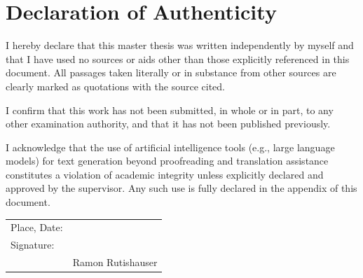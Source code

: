 \chapter*{Declaration of Authenticity}

I hereby declare that this master thesis was written independently by myself and that I have used no sources or aids other than those explicitly referenced in this document. All passages taken literally or in substance from other sources are clearly marked as quotations with the source cited.

I confirm that this work has not been submitted, in whole or in part, to any other examination authority, and that it has not been published previously.

I acknowledge that the use of artificial intelligence tools (e.g., large language models) for text generation beyond proofreading and translation assistance constitutes a violation of academic integrity unless explicitly declared and approved by the supervisor. Any such use is fully declared in the appendix of this document.

\bigskip\bigskip

\noindent
\begin{tabular}{@{}ll@{}}
Place, Date: & \underline{\hspace{6cm}} \\[1.5em]
Signature:   & \underline{\hspace{6cm}} \\[0.5em]
             & Ramon Rutishauser\\
\end{tabular}

